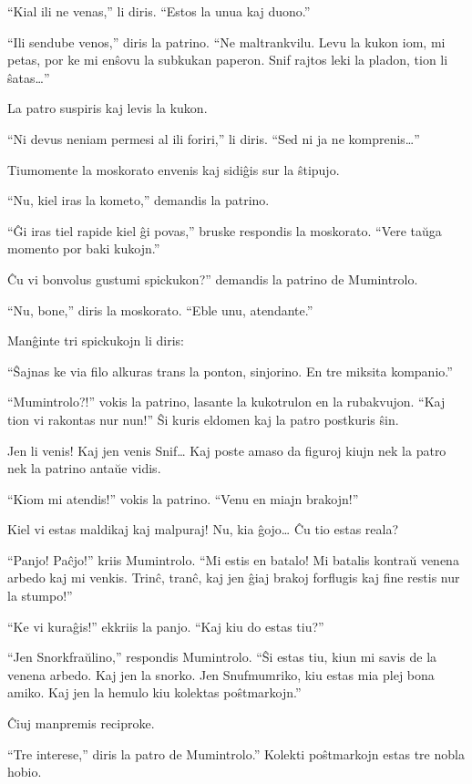 ``Kial ili ne venas,'' li diris. ``Estos la unua kaj duono.''

``Ili sendube venos,'' diris la patrino. ``Ne maltrankvilu. Levu la kukon iom, mi petas, por ke mi enŝovu la subkukan paperon. Snif rajtos leki la pladon, tion li ŝatas{\ldots}''

La patro suspiris kaj levis la kukon.

``Ni devus neniam permesi al ili foriri,'' li diris. ``Sed ni ja ne komprenis{\ldots}''

Tiumomente la moskorato envenis kaj sidiĝis sur la ŝtipujo.

``Nu, kiel iras la kometo,'' demandis la patrino.

``Ĝi iras tiel rapide kiel ĝi povas,'' bruske respondis la moskorato. ``Vere taŭga momento por baki kukojn.''

Ĉu vi bonvolus gustumi spickukon?'' demandis la patrino de Mumintrolo.

``Nu, bone,'' diris la moskorato. ``Eble unu, atendante.''

Manĝinte tri spickukojn li diris:

``Ŝajnas ke via filo alkuras trans la ponton, sinjorino. En tre miksita kompanio.''

``Mumintrolo?!'' vokis la patrino, lasante la kukotrulon en la rubakvujon. ``Kaj tion vi rakontas nur nun!'' Ŝi kuris eldomen kaj la patro postkuris ŝin.

Jen li venis! Kaj jen venis Snif{\ldots} Kaj poste amaso da figuroj kiujn nek la patro nek la patrino antaŭe vidis.

``Kiom mi atendis!'' vokis la patrino. ``Venu en miajn brakojn!''

Kiel vi estas maldikaj kaj malpuraj! Nu, kia ĝojo{\ldots} Ĉu tio estas reala?

``Panjo! Paĉjo!'' kriis Mumintrolo. ``Mi estis en batalo! Mi batalis kontraŭ venena arbedo kaj mi venkis. Trinĉ, tranĉ, kaj jen ĝiaj brakoj forflugis kaj fine restis nur la stumpo!''

``Ke vi kuraĝis!'' ekkriis la panjo. ``Kaj kiu do estas tiu?''

``Jen Snorkfraŭlino,'' respondis Mumintrolo. ``Ŝi estas tiu, kiun mi savis de la venena arbedo. Kaj jen la snorko. Jen Snufmumriko, kiu estas mia plej bona amiko. Kaj jen la hemulo kiu kolektas poŝtmarkojn.''

Ĉiuj manpremis reciproke.

``Tre interese,'' diris la patro de Mumintrolo.'' Kolekti poŝtmarkojn estas tre nobla hobio.

